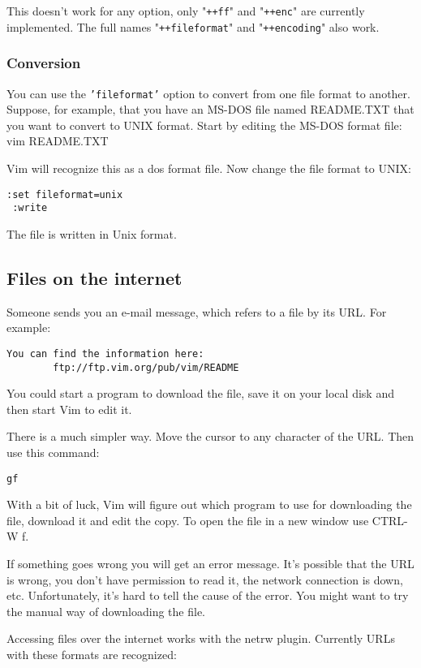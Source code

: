This doesn't work for any option, only "\texttt{++ff}" and "\texttt{++enc}" are currently implemented.
The full names "\texttt{++fileformat}" and "\texttt{++encoding}" also work.
\subsubsection{Conversion}
You can use the \texttt{'fileformat'} option to convert from one file format to another.
Suppose, for example, that you have an MS-DOS file named README.TXT that you want to convert to UNIX format.
Start by editing the MS-DOS format file: vim README.TXT

Vim will recognize this as a dos format file.
Now change the file format to UNIX:

\begin{Verbatim}[samepage=true]
 :set fileformat=unix
 :write
\end{Verbatim}

The file is written in Unix format.
\subsection{Files on the internet}
Someone sends you an e-mail message, which refers to a file by its URL.
For example:

\begin{Verbatim}[samepage=true]
    You can find the information here: 
        ftp://ftp.vim.org/pub/vim/README 
\end{Verbatim}

You could start a program to download the file, save it on your local disk and then start Vim to edit it.

There is a much simpler way.
Move the cursor to any character of the URL.
Then use this command:

\begin{Verbatim}[samepage=true]
 gf
\end{Verbatim}

With a bit of luck, Vim will figure out which program to use for downloading the file, download it and edit the copy.
To open the file in a new window use CTRL-W f.

If something goes wrong you will get an error message.
It's possible that the URL is wrong, you don't have permission to read it, the network connection is down, etc.
Unfortunately, it's hard to tell the cause of the error.
You might want to try the manual way of downloading the file.

Accessing files over the internet works with the netrw plugin.
Currently URLs with these formats are recognized:


